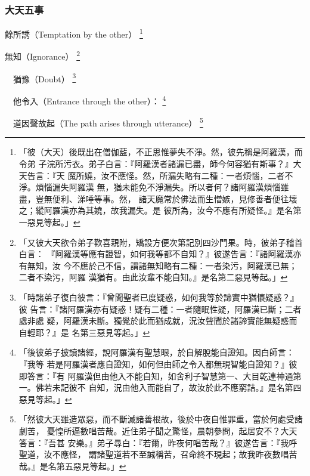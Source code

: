 \subsubsection{大天五事}
 餘所誘（Temptation by the other）
 \footnote{
「彼（大天）後既出在僧伽藍，不正思惟夢失不淨。然，彼先稱是阿羅漢，而令弟
子浣所污衣。弟子白言：『阿羅漢者諸漏已盡，師今何容猶有斯事？』大天告言：『天
魔所嬈，汝不應怪。然，所漏失略有二種：一者煩惱，二者不淨。煩惱漏失阿羅漢
無，猶未能免不淨漏失。所以者何？諸阿羅漢煩惱雖盡，豈無便利、涕唾等事。然，
諸天魔常於佛法而生憎嫉，見修善者便往壞之；縱阿羅漢亦為其嬈，故我漏失。是
彼所為，汝今不應有所疑怪。』是名第一惡見等起。」}

 無知（Ignorance）
\footnote{「又彼大天欲令弟子歡喜親附，矯設方便次第記別四沙門果。時，彼弟子稽首白言：
『阿羅漢等應有證智，如何我等都不自知？』彼遂告言：『諸阿羅漢亦有無知，汝
今不應於己不信，謂諸無知略有二種：一者染污，阿羅漢已無；二者不染污，阿羅
漢猶有。由此汝輩不能自知。』是名第二惡見等起。」}

　猶豫（Doubt）
\footnote{「時諸弟子復白彼言：『曾聞聖者已度疑惑，如何我等於諦實中猶懷疑惑？』彼
告言：『諸阿羅漢亦有疑惑！疑有二種：一者隨眠性疑，阿羅漢已斷；二者處非處
疑，阿羅漢未斷。獨覺於此而猶成就，況汝聲聞於諸諦實能無疑惑而自輕耶？』是
名第三惡見等起。」}

　他令入（Entrance through the other）：
\footnote{「後彼弟子披讀諸經，說阿羅漢有聖慧眼，於自解脫能自證知。因白師言：『我等
若是阿羅漢者應自證知，如何但由師之令入都無現智能自證知？』彼即答言：『有
阿羅漢但由他入不能自知，如舍利子智慧第一、大目乾連神通第一。佛若未記彼不
自知，況由他入而能自了，故汝於此不應窮詰。』是名第四惡見等起。」}

　道因聲故起（The path arises through utterance）
\footnote{「然彼大天雖造眾惡，而不斷滅諸善根故，後於中夜自惟罪重，當於何處受諸劇苦，
憂惶所逼數唱苦哉。近住弟子聞之驚怪，晨朝參問，起居安不？大天答言：『吾甚
安樂。』弟子尋白：『若爾，昨夜何唱苦哉？』彼遂告言：『我呼聖道，汝不應怪，
謂諸聖道若不至誠稱苦，召命終不現起；故我昨夜數唱苦哉。』是名第五惡見等起。」}
